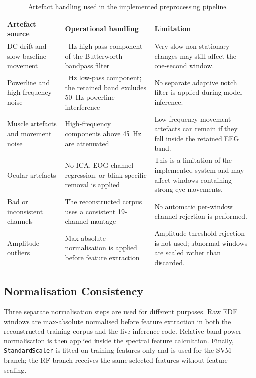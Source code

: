 \documentclass[12pt, a4paper]{report}
\begin{document}
\begin{table}[H]
  \centering
  \caption{Artefact handling used in the implemented preprocessing pipeline.}
  \label{tab:artefact_handling}
  \footnotesize
  \renewcommand{\arraystretch}{1.18}
  \begin{tabularx}{\textwidth}{>{\raggedright\arraybackslash}p{3.5cm}
                              >{\raggedright\arraybackslash}p{4.2cm}
                              >{\raggedright\arraybackslash}X}
    \toprule
    \textbf{Artefact source} & \textbf{Operational handling} & \textbf{Limitation} \\
    \midrule
    DC drift and slow baseline movement &
    0.5~Hz high-pass component of the Butterworth bandpass filter &
    Very slow non-stationary changes may still affect the one-second window. \\
    Powerline and high-frequency noise &
    45~Hz low-pass component; the retained band excludes 50~Hz powerline
    interference &
    No separate adaptive notch filter is applied during model inference. \\
    Muscle artefacts and movement noise &
    High-frequency components above 45~Hz are attenuated &
    Low-frequency movement artefacts can remain if they fall inside the
    retained EEG band. \\
    Ocular artefacts &
    No ICA, EOG channel regression, or blink-specific removal is applied &
    This is a limitation of the implemented system and may affect windows
    containing strong eye movements. \\
    Bad or inconsistent channels &
    The reconstructed corpus uses a consistent 19-channel montage &
    No automatic per-window channel rejection is performed. \\
    Amplitude outliers &
    Max-absolute normalisation is applied before feature extraction &
    Amplitude threshold rejection is not used; abnormal windows are scaled
    rather than discarded. \\
    \bottomrule
  \end{tabularx}
\end{table}

\subsection{Normalisation Consistency}

Three separate normalisation steps are used for different purposes. Raw EDF
windows are max-absolute normalised before feature extraction in both the
reconstructed training corpus and the live inference code. Relative band-power
normalisation is then applied inside the spectral feature calculation. Finally,
\texttt{StandardScaler} is fitted on training features only and is used for
the SVM branch; the RF branch receives the same selected features without
feature scaling.
\end{document}
